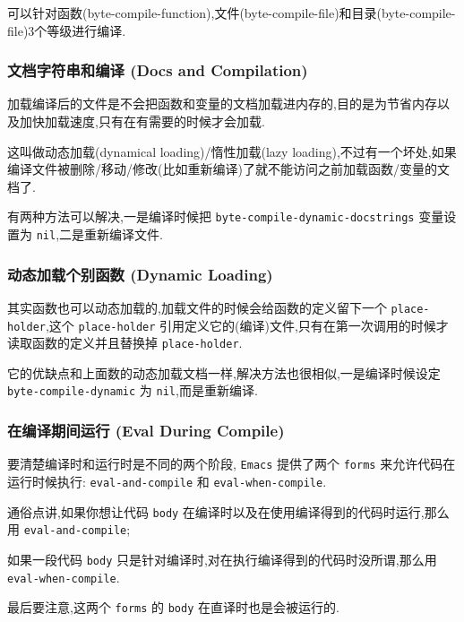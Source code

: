 \documentclass[11pt]{article}
\begin{document}
可以针对函数(byte-compile-function),文件(byte-compile-file)和目录(byte-compile-file)3个等级进行编译.




\subsubsection{文档字符串和编译 (Docs and Compilation)}
\label{sec:org51dc337}

加载编译后的文件是不会把函数和变量的文档加载进内存的,目的是为节省内存以及加快加载速度,只有在有需要的时候才会加载.

这叫做动态加载(dynamical loading)/惰性加载(lazy loading),不过有一个坏处,如果编译文件被删除/移动/修改(比如重新编译)了就不能访问之前加载函数/变量的文档了.

有两种方法可以解决,一是编译时候把 \texttt{byte-compile-dynamic-docstrings} 变量设置为 \texttt{nil},二是重新编译文件.



\subsubsection{动态加载个别函数 (Dynamic Loading)}
\label{sec:org8ff206a}

其实函数也可以动态加载的,加载文件的时候会给函数的定义留下一个 \texttt{place-holder},这个 \texttt{place-holder} 引用定义它的(编译)文件,只有在第一次调用的时候才读取函数的定义并且替换掉 \texttt{place-holder}.

它的优缺点和上面数的动态加载文档一样,解决方法也很相似,一是编译时候设定 \texttt{byte-compile-dynamic} 为 \texttt{nil},而是重新编译.



\subsubsection{在编译期间运行 (Eval During Compile)}
\label{sec:org661752f}

要清楚编译时和运行时是不同的两个阶段, \texttt{Emacs} 提供了两个 \texttt{forms} 来允许代码在运行时候执行: \texttt{eval-and-compile} 和 \texttt{eval-when-compile}.

通俗点讲,如果你想让代码 \texttt{body} 在编译时以及在使用编译得到的代码时运行,那么用 \texttt{eval-and-compile};

如果一段代码 \texttt{body} 只是针对编译时,对在执行编译得到的代码时没所谓,那么用 \texttt{eval-when-compile}.

最后要注意,这两个 \texttt{forms} 的 \texttt{body} 在直译时也是会被运行的.
\end{document}
